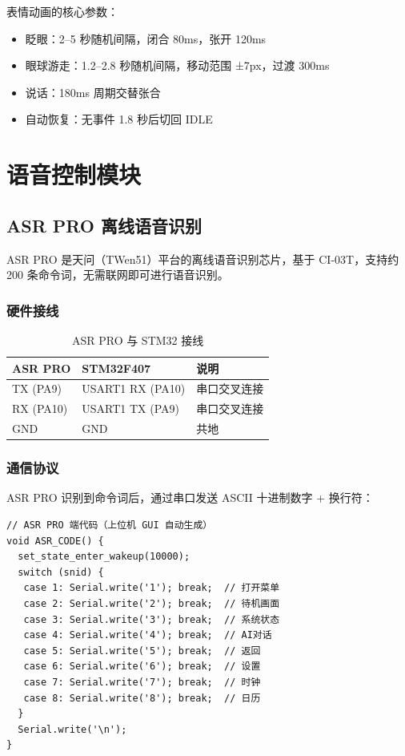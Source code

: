 \documentclass[12pt,a4paper]{ctexart}
\begin{document}
表情动画的核心参数：

\begin{itemize}
    \item 眨眼：2--5 秒随机间隔，闭合 80ms，张开 120ms
    \item 眼球游走：1.2--2.8 秒随机间隔，移动范围 ±7px，过渡 300ms
    \item 说话：180ms 周期交替张合
    \item 自动恢复：无事件 1.8 秒后切回 IDLE
\end{itemize}

\section{语音控制模块}

\subsection{ASR PRO 离线语音识别}

ASR PRO 是天问（TWen51）平台的离线语音识别芯片，基于 CI-03T，支持约 200 条命令词，无需联网即可进行语音识别。

\subsubsection{硬件接线}

\begin{table}[H]
\centering
\begin{tabular}{lll}
\toprule
\textbf{ASR PRO} & \textbf{STM32F407} & \textbf{说明} \\
\midrule
TX (PA9)  & USART1 RX (PA10) & 串口交叉连接 \\
RX (PA10) & USART1 TX (PA9)  & 串口交叉连接 \\
GND       & GND              & 共地 \\
\bottomrule
\end{tabular}
\caption{ASR PRO 与 STM32 接线}
\end{table}

\subsubsection{通信协议}

ASR PRO 识别到命令词后，通过串口发送 ASCII 十进制数字 + 换行符：

\begin{lstlisting}
// ASR PRO 端代码（上位机 GUI 自动生成）
void ASR_CODE() {
  set_state_enter_wakeup(10000);
  switch (snid) {
   case 1: Serial.write('1'); break;  // 打开菜单
   case 2: Serial.write('2'); break;  // 待机画面
   case 3: Serial.write('3'); break;  // 系统状态
   case 4: Serial.write('4'); break;  // AI对话
   case 5: Serial.write('5'); break;  // 返回
   case 6: Serial.write('6'); break;  // 设置
   case 7: Serial.write('7'); break;  // 时钟
   case 8: Serial.write('8'); break;  // 日历
  }
  Serial.write('\n');
}
\end{lstlisting}
\end{document}
